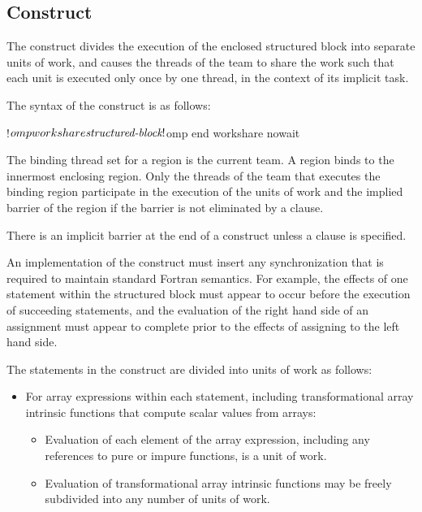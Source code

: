 \begin{fortranspecific}

\subsection{ Construct}
\label{subsec:workshare Construct}
\summary
The  construct divides the execution of the enclosed structured 
block into separate units of work, and causes the threads of the team to share 
the work such that each unit is executed only once by one thread, in the context 
of its implicit task.

\syntax
The syntax of the  construct is as follows:

\begin{ompfPragma}
!$omp workshare
    \plc{structured-block}
!$omp end workshare \plc{[}nowait\plc{]}
\end{ompfPragma}

\binding
The binding thread set for a  region is the current team. 
A  region binds to the innermost enclosing  
region. Only the threads of the team that executes the binding  
region participate in the execution of the units of work and the implied 
barrier of the  region if the barrier is not eliminated
by a  clause.

\descr
There is an implicit barrier at the end of a  construct 
unless a  clause is specified.

An implementation of the  construct must insert any synchronization 
that is required to maintain standard Fortran semantics. For example, the effects 
of one statement within the structured block must appear to occur before the 
execution of succeeding statements, and the evaluation of the right hand side of 
an assignment must appear to complete prior to the effects of assigning to the left 
hand side. 

The statements in the  construct are divided into units of work 
as follows:

\begin{itemize}
\item For array expressions within each statement, including transformational 
      array intrinsic functions that compute scalar values from arrays:

\begin{itemize}
\item Evaluation of each element of the array expression, including any 
      references to pure or impure  functions, is a unit of work.
\item Evaluation of transformational array intrinsic functions may be freely
      subdivided into any number of units of work.
\end{itemize}


\end{itemize}
\end{fortranspecific}
